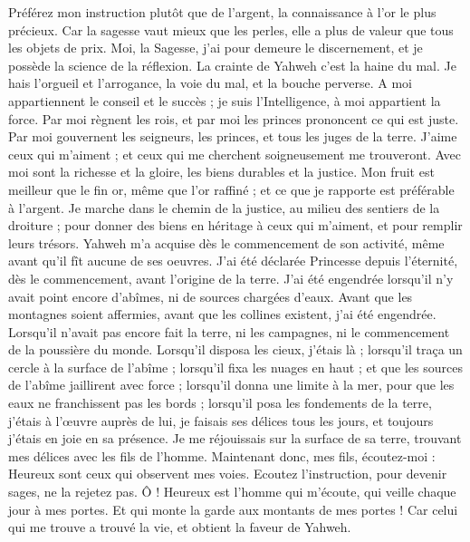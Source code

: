 \begin{multicols}{2}
Préférez mon instruction plutôt que de l'argent, la connaissance à l’or le plus précieux.
Car la sagesse vaut mieux que les perles, elle a plus de valeur que tous les objets de prix.
Moi, la Sagesse, j’ai pour demeure le discernement, et je possède la science de la réflexion.
La crainte de Yahweh c'est la haine du mal. Je hais l'orgueil et l'arrogance, la voie du mal, et la bouche perverse.
A moi appartiennent le conseil et le succès ; je suis l’Intelligence, à moi appartient la force.
Par moi règnent les rois, et par moi les princes prononcent ce qui est juste.
Par moi gouvernent les seigneurs, les princes, et tous les juges de la terre.
J'aime ceux qui m'aiment ; et ceux qui me cherchent soigneusement me trouveront.
Avec moi sont la richesse et la gloire, les biens durables et la justice.
Mon fruit est meilleur que le fin or, même que l'or raffiné ; et ce que je rapporte est préférable à l'argent.
Je marche dans le chemin de la justice, au milieu des sentiers de la droiture ;
pour donner des biens en héritage à ceux qui m'aiment, et pour remplir leurs trésors.
Yahweh m'a acquise dès le commencement de son activité, même avant qu'il fît aucune de ses oeuvres.
J'ai été déclarée Princesse depuis l’éternité, dès le commencement, avant l’origine de la terre.
J'ai été engendrée lorsqu'il n'y avait point encore d'abîmes, ni de sources chargées d'eaux.
Avant que les montagnes soient affermies, avant que les collines existent, j’ai été engendrée.
Lorsqu'il n'avait pas encore fait la terre, ni les campagnes, ni le commencement de la poussière du monde.
Lorsqu’il disposa les cieux, j’étais là ; lorsqu’il traça un cercle à la surface de l’abîme ;
lorsqu’il fixa les nuages en haut ; et que les sources de l’abîme jaillirent avec force ;
lorsqu’il donna une limite à la mer, pour que les eaux ne franchissent pas les bords ; lorsqu’il posa les fondements de la terre,
j’étais à l’œuvre auprès de lui, je faisais ses délices tous les jours, et toujours j'étais en joie en sa présence.
Je me réjouissais sur la surface de sa terre, trouvant mes délices avec les fils de l’homme.
Maintenant donc, mes fils, écoutez-moi : Heureux sont ceux qui observent mes voies.
Ecoutez l'instruction, pour devenir sages, ne la rejetez pas.
Ô ! Heureux est l'homme qui m'écoute, qui veille chaque jour à mes portes. Et qui monte la garde aux montants de mes portes !
Car celui qui me trouve a trouvé la vie, et obtient la faveur de Yahweh.

\end{multicols}
